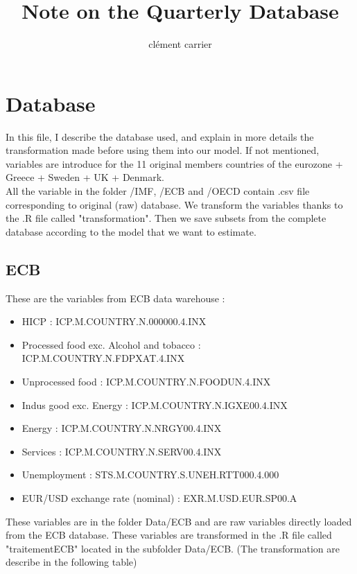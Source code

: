 \documentclass[11pt,a4paper]{article}
\title{Note on the Quarterly Database}
\author{clément carrier}
\begin{document}
\maketitle

\section{Database}

In this file, I describe the database used, and explain in more details the transformation made before using them into our model. If not mentioned, variables are introduce for the 11 original members countries of the eurozone + Greece + Sweden + UK + Denmark.\\

All the variable in the folder /IMF, /ECB and /OECD contain .csv file corresponding to original (raw) database. We transform the variables thanks to the .R file called "transformation". Then we save subsets from the complete database according to the model that we want to estimate. 




\subsection{ECB}

These are the variables from ECB data warehouse :
\begin{itemize}
\item HICP : ICP.M.COUNTRY.N.000000.4.INX
\item Processed food exc. Alcohol and tobacco : ICP.M.COUNTRY.N.FDPXAT.4.INX
\item Unprocessed food	: ICP.M.COUNTRY.N.FOODUN.4.INX
\item Indus good exc. Energy : ICP.M.COUNTRY.N.IGXE00.4.INX
\item Energy	:	ICP.M.COUNTRY.N.NRGY00.4.INX
\item Services	:	ICP.M.COUNTRY.N.SERV00.4.INX
\item Unemployment : STS.M.COUNTRY.S.UNEH.RTT000.4.000
\item EUR/USD exchange rate (nominal) : EXR.M.USD.EUR.SP00.A
\end{itemize}

\vspace{0.5cm}

These variables are in the folder Data/ECB and are raw variables directly loaded from the ECB database. These variables are transformed in the .R file called "traitementECB" located in the subfolder Data/ECB. (The transformation are describe in the following table) \\
\end{document}
